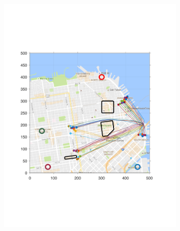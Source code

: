 \begin{figure}[!htb]
\begin{subfigure}{0.5\textwidth}
  \includegraphics[width=\columnwidth]{figs/sf_d6sep0_s3}
  \subcaption{}
  \label{fig:sf_d6sep0_s3}
\end{subfigure}%
\begin{subfigure}{0.5\textwidth}

\end{subfigure}
\end{figure}
